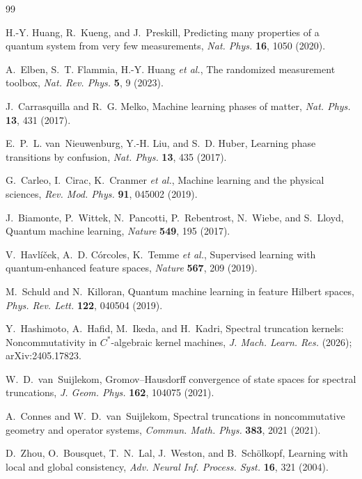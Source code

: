 \documentclass[aps,prresearch,reprint,amsmath,amssymb,nofootinbib,superscriptaddress,floatfix]{revtex4-2}
\theoremstyle{definition}
\theoremstyle{remark}
\theoremstyle{plain}
\begin{document}
\begin{thebibliography}{99}
\sloppy

H.-Y. Huang, R.~Kueng, and J.~Preskill,
Predicting many properties of a quantum system from very few measurements,
\emph{Nat. Phys.} \textbf{16}, 1050 (2020).

A.~Elben, S.~T. Flammia, H.-Y. Huang \emph{et al.},
The randomized measurement toolbox,
\emph{Nat. Rev. Phys.} \textbf{5}, 9 (2023).

J.~Carrasquilla and R.~G. Melko,
Machine learning phases of matter,
\emph{Nat. Phys.} \textbf{13}, 431 (2017).

E.~P.~L. van~Nieuwenburg, Y.-H. Liu, and S.~D. Huber,
Learning phase transitions by confusion,
\emph{Nat. Phys.} \textbf{13}, 435 (2017).

G.~Carleo, I.~Cirac, K.~Cranmer \emph{et al.},
Machine learning and the physical sciences,
\emph{Rev. Mod. Phys.} \textbf{91}, 045002 (2019).

J.~Biamonte, P.~Wittek, N.~Pancotti, P.~Rebentrost, N.~Wiebe, and S.~Lloyd,
Quantum machine learning,
\emph{Nature} \textbf{549}, 195 (2017).

V.~Havl\'i\v{c}ek, A.~D. C\'orcoles, K.~Temme \emph{et al.},
Supervised learning with quantum-enhanced feature spaces,
\emph{Nature} \textbf{567}, 209 (2019).

M.~Schuld and N.~Killoran,
Quantum machine learning in feature Hilbert spaces,
\emph{Phys. Rev. Lett.} \textbf{122}, 040504 (2019).

Y.~Hashimoto, A.~Hafid, M.~Ikeda, and H.~Kadri,
Spectral truncation kernels: Noncommutativity in $C^*$-algebraic kernel machines,
\emph{J. Mach. Learn. Res.} (2026); arXiv:2405.17823.

W.~D.~van~Suijlekom,
Gromov--Hausdorff convergence of state spaces for spectral truncations,
\emph{J. Geom. Phys.} \textbf{162}, 104075 (2021).

A.~Connes and W.~D.~van~Suijlekom,
Spectral truncations in noncommutative geometry and operator systems,
\emph{Commun. Math. Phys.} \textbf{383}, 2021 (2021).

D.~Zhou, O.~Bousquet, T.~N.~Lal, J.~Weston, and B.~Sch\"olkopf,
Learning with local and global consistency,
\emph{Adv. Neural Inf. Process. Syst.} \textbf{16}, 321 (2004).


\end{thebibliography}
\end{document}

